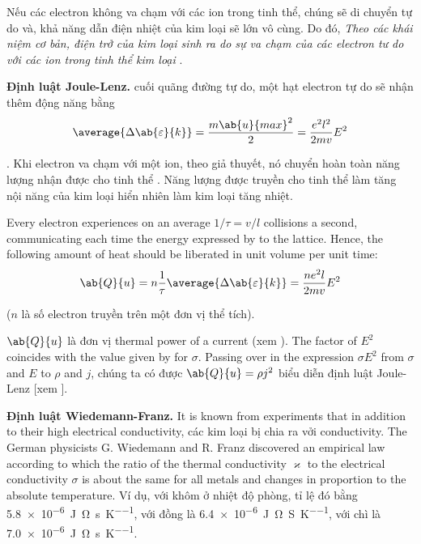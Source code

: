 \noindent
Nếu các electron không va chạm với các ion trong tinh thể, chúng sẽ di chuyển tự do và, khả năng dẫn điện nhiệt của kim loại sẽ lớn vô cùng.
Do đó, \textit{Theo các khái niệm cơ bản, điện trở của kim loại sinh ra do sự va chạm của các electron tư do với các ion trong tinh thể kim loại }.

\textbf{Định luật Joule-Lenz.} cuối quãng đường tự do, một hạt electron tự do sẽ nhận thêm động năng bằng
\begin{equation}\label{eq:11_10}
    \average{\Delta{\ab{\varepsilon}{k}}} = \frac{m \ab{u}{max}^2}{2} = \frac{e^2l^2}{2mv} E^2
\end{equation}

.
Khi electron va chạm với một ion, theo giả thuyết, nó chuyển hoàn toàn năng lượng nhận được cho tinh thể .
Năng lượng được truyền cho tinh thể  làm tăng nội năng của kim loại hiển nhiên làm kim loại tăng nhiệt.

Every electron experiences on an average $1/\tau=v/l$ collisions a second, communicating each time the energy expressed by  to the lattice.
Hence, the following amount of heat should be liberated in unit volume per unit time:
\begin{equation*}
    \ab{Q}{u} = n \frac{1}{\tau} \average{\Delta{\ab{\varepsilon}{k}}} = \frac{ne^2l}{2mv} E^2
\end{equation*}

\noindent
($n$ là số electron truyền trên một đơn vị thể tích).

$\ab{Q}{u}$ là đơn vị thermal power of a current (xem ).
The factor of $E^2$ coincides with the value given by  for $\sigma$.
Passing over in the expression $\sigma E^2$ from $\sigma$ and $E$ to $\rho$ and $j$, chúng ta có được $\ab{Q}{u}=\rho j^2$ biểu diễn định luật Joule-Lenz [xem ].

\textbf{Định luật Wiedemann-Franz.} It is known from experiments that in addition to their high electrical conductivity, các kim loại bị chia ra vởi conductivity.
The German physicists G. Wiedemann and R. Franz discovered an empirical law according to which the ratio of the thermal conductivity $\varkappa$ to the electrical conductivity $\sigma$ is about the same for all metals and changes in proportion to the absolute temperature.
Ví dụ, với khôm ở nhiệt độ phòng, tỉ lệ đó bằng \SI{5.8e-6}{\joule\ohm\per\second\per\kelvin}, với đồng là \SI{6.4e-6}{\joule\ohm\per\siemens\per\kelvin}, với chì là \SI{7.0e-6}{\joule\ohm\per\second\per\kelvin}.

